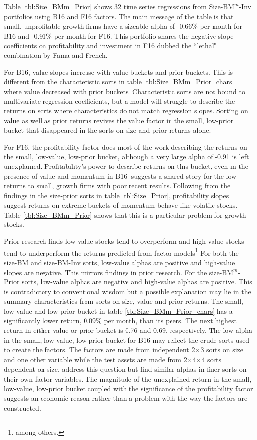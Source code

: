
Table \ref{tbl:Size_BMm_Prior} shows 32 time series regressions from
Size-$\text{BM}^{m}$-Inv portfolios using B16 and F16 factors.
The main message of the table is that small, unprofitable growth firms have a
sizeable alpha of -0.66\% per month for B16 and -0.91\% per month for F16.
This portfolio shares the negative slope coefficients on profitability and
investment in F16 dubbed the ``lethal" combination by Fama and French.

For B16, value slopes increase with value buckets and prior buckets.
This is different from the characteristic sorts in table
\ref{tbl:Size_BMm_Prior_chars} where value decreased with prior buckets.
Characteristic sorts are not bound to multivariate regression coefficients, but
a model will struggle to describe the returns on sorts where characteristics do
not match regression slopes.
Sorting on value as well as prior returns revives the value factor in the
small, low-prior bucket that disappeared in the sorts on size and prior returns
alone.

For F16, the profitability factor does most of the work describing the returns
on the small, low-value, low-prior bucket, although a very large alpha of -0.91
is left unexplained.
Profitability's power to describe returns on this bucket, even in the presence
of value and momentum in B16, suggests a shared story for the low returns to
small, growth firms with poor recent results.
Following from the findings in the size-prior sorts in table
\ref{tbl:Size_Prior}, profitability slopes suggest returns on extreme buckets
of momentum behave like volatile stocks.
Table \ref{tbl:Size_BMm_Prior} shows that this is a particular problem for
growth stocks.

Prior research finds low-value stocks tend to overperform and high-value stocks
tend to underperform the returns predicted from factor models\footnote{
\textcite{fama1992cross, fama1993common, loughran1997book, fama2006value}
among others.}
For both the size-BM and size-BM-Inv sorts, low-value alphas are positive and
high-value slopes are negative.
This mirrors findings in prior research.
For the size-$\text{BM}^m$-Prior sorts, low-value alphas are negative and
high-value alphas are positive.
This is contradictory to conventional wisdom but a possible explanation may lie
in the summary characteristics from sorts on size, value and prior returns.
The small, low-value and low-prior bucket in table
\ref{tbl:Size_BMm_Prior_chars} has a significantly lower return, 0.09\% per
month, than its peers.
The next highest return in either value or prior bucket is 0.76 and 0.69,
respectively.
The low alpha in the small, low-value, low-prior bucket for B16 may reflect
the crude sorts used to create the factors.
The factors are made from independent 2$\times$3 sorts on size and one other
variable while the test assets are made from 2$\times$4$\times$4 sorts
dependent on size.
\textcite{fama2015five} address this question but find similar alphas in finer
sorts on their own factor variables.
The magnitude of the unexplained return in the small, low-value, low-prior
bucket coupled with the significance of the profitability factor suggests an
economic reason rather than a problem with the way the factors are constructed.

